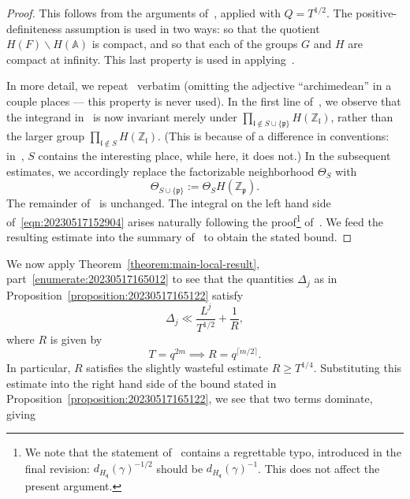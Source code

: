\documentclass[reqno]{amsart}
\theoremstyle{plain} \newtheorem{theorem} {Theorem} \newtheorem{conjecture} {Conjecture} \newtheorem{corollary} [theorem] {Corollary} \newtheorem{proposition} [theorem] {Proposition} \newtheorem{fact} [theorem] {Fact}
\theoremstyle{definition} \newtheorem{definition} [theorem] {Definition}
\theoremstyle{itplain} %
\newcommand{\mfp}{\mathfrak{p}}
\newcommand{\mfop}{\mathfrak{l}}
\begin{document}
\begin{proof}
  This follows from the arguments of~\cite[\S6]{2020arXiv201202187N}, applied with $Q=T^{1/2}$.  The positive-definiteness assumption is used in two ways: so that the quotient $H(F) \backslash H(\mathbb{A})$ is compact, and so that each of the groups $G$ and $H$ are compact at infinity.  This last property is used in applying~\cite[Lem 5.1]{2020arXiv201202187N}.

  In more detail, we repeat~\cite[\S6.1-6.4]{2020arXiv201202187N} verbatim (omitting the adjective ``archimedean'' in a couple places --- this property is never used).  In the first line of~\cite[\S6.5.1]{2020arXiv201202187N}, we observe that the integrand in~\cite[(6.5)]{2020arXiv201202187N} is now invariant merely under $\prod_{\mfop \notin S \cup \{\mfp \}} H(\mathbb{Z}_\mfop)$, rather than the larger group $\prod_{\mfop \notin S} H(\mathbb{Z}_\mfop)$.  (This is because of a difference in conventions: in~\cite{2020arXiv201202187N}, $S$ contains the interesting place, while here, it does not.) In the subsequent estimates, we accordingly replace the factorizable neighborhood $\Theta_S$ with
  \begin{equation*}
    \Theta_{S \cup \{\mfp \}} := \Theta_S H(\mathbb{Z}_\mfp).
  \end{equation*}
  The remainder of~\cite[\S6.5.1-6.5.2]{2020arXiv201202187N} is unchanged.  The integral on the left hand side of~\eqref{eqn:20230517152904} arises naturally following the proof\footnote{We note that the statement of~\cite[Lem 6.7]{2020arXiv201202187N} contains a regrettable typo, introduced in the final revision: ${d_{H_\mathfrak{q}}(\gamma)}^{-1/2}$ should be ${d_{H_\mathfrak{q}}(\gamma)}^{-1}$.  This does not affect the present argument.}  of~\cite[Lem 6.7]{2020arXiv201202187N}.  We feed the resulting estimate into the summary of~\cite[\S6.6]{2020arXiv201202187N} to obtain the stated bound.
\end{proof}
We now apply Theorem~\ref{theorem:main-local-result}, part~\eqref{enumerate:20230517165012} to see that the quantities $\Delta_j$ as in Proposition~\ref{proposition:20230517165122} satisfy
\begin{equation}\label{eqn:20230517165322}
  \Delta_j \ll \frac{L^j}{T^{1/2}} + \frac{1}{R },
\end{equation}
where $R$ is given by
\begin{equation*}
  T = q^{2 m} \implies R = q^{\lceil m/2 \rceil}.
\end{equation*}
In particular, $R$ satisfies the slightly wasteful estimate $R \geq T^{1/4} $.  Substituting this estimate into the right hand side of the bound stated in Proposition~\ref{proposition:20230517165122}, we see that two terms dominate, giving
\end{document}
